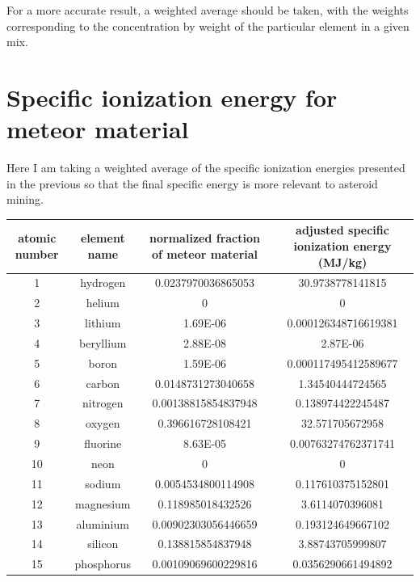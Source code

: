 \documentclass[a4paper]{article}
\begin{document}
	\medskip
	
	For a more accurate result, a weighted average should be taken, with the weights corresponding to the concentration by weight of the particular element in a given mix.
    
	\pagebreak
	
	\section{Specific ionization energy for meteor material}
	
	Here I am taking a weighted average of the specific ionization energies presented in the previous so that the final specific energy is more relevant to asteroid mining.
	
	\scriptsize
	
	\begin{center}
		\begin{tabular}{|c|c|c|c|}
			\hline
			atomic number & element name & normalized fraction of meteor material & adjusted specific ionization energy (MJ/kg) \\
			\hline
			1 & hydrogen & 0.0237970036865053 & 30.9738778141815 \\
			\hline
			2 & helium & 0 & 0 \\
			\hline
			3 & lithium & 1.69E-06 & 0.000126348716619381 \\
			\hline
			4 & beryllium & 2.88E-08 & 2.87E-06 \\
			\hline
			5 & boron & 1.59E-06 & 0.000117495412589677 \\
			\hline
			6 & carbon & 0.0148731273040658 & 1.34540444724565 \\
			\hline
			7 & nitrogen & 0.00138815854837948 & 0.138974422245487 \\
			\hline
			8 & oxygen & 0.396616728108421 & 32.571705672958 \\
			\hline
			9 & fluorine & 8.63E-05 & 0.00763274762371741 \\
			\hline
			10 & neon & 0 & 0 \\
			\hline
			11 & sodium & 0.0054534800114908 & 0.117610375152801 \\
			\hline
			12 & magnesium & 0.118985018432526 & 3.6114070396081 \\
			\hline
			13 & aluminium & 0.00902303056446659 & 0.193124649667102 \\
			\hline
			14 & silicon & 0.138815854837948 & 3.88743705999807 \\
			\hline
			15 & phosphorus & 0.00109069600229816 & 0.0356290661494892 \\

\end{tabular}
\end{center}
\end{document}
